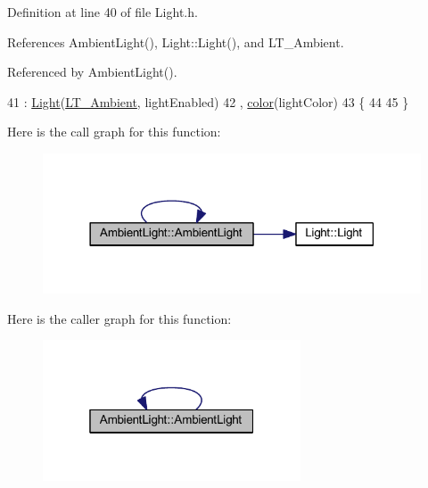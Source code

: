 Definition at line 40 of file Light.\+h.



References Ambient\+Light(), Light\+::\+Light(), and L\+T\+\_\+\+Ambient.



Referenced by Ambient\+Light().


\begin{DoxyCode}
41     : \hyperlink{struct_light_a0df5e58af351bd13c996da2880be0dee}{Light}(\hyperlink{_light_8h_a3336214f41ddc8acd932fa9be957047da7f5cad38d8883da3c4cf77417530eebe}{LT\_Ambient}, lightEnabled)
42     , \hyperlink{struct_ambient_light_af89096906b189fc10a3960b6e5f9b44c}{color}(lightColor)
43   \{
44 
45   \}
\end{DoxyCode}


Here is the call graph for this function\+:\nopagebreak
\begin{figure}[H]
\begin{center}
\leavevmode
\includegraphics[width=318pt]{struct_ambient_light_af6960d19d0e491643fef45009ba73437_cgraph}
\end{center}
\end{figure}




Here is the caller graph for this function\+:\nopagebreak
\begin{figure}[H]
\begin{center}
\leavevmode
\includegraphics[width=217pt]{struct_ambient_light_af6960d19d0e491643fef45009ba73437_icgraph}
\end{center}
\end{figure}




